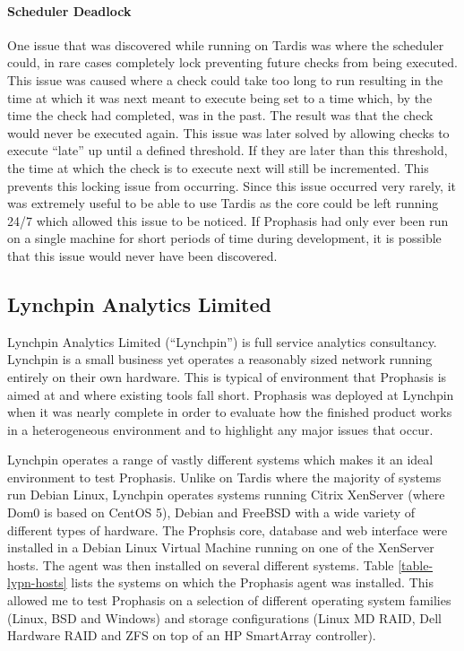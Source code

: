 \documentclass[bsc,logo,twoside,parskip,singlespacing,notimes]{infthesis}
\begin{document}
\paragraph*{Scheduler Deadlock} %
	One issue that was discovered while running on Tardis was where the scheduler
	could, in rare cases completely lock preventing future checks from being
	executed.  This issue was caused where a check could take too long to run
	resulting in the time at which it was next meant to execute being set to a
	time which, by the time the check had completed, was in the past.  The result
	was that the check would never be executed again.  This issue was later solved by
	allowing checks to execute ``late'' up until a defined threshold. If they are
	later than this threshold, the time at which the check is to execute next will
	still be incremented.  This prevents this locking issue from occurring. Since
	this issue occurred very rarely, it was extremely useful to be able to use
	Tardis as the core could be left running 24/7 which allowed this issue to be
	noticed. If Prophasis had only ever been run on a single machine for short
	periods of time during development, it is possible that this issue would never
	have been discovered.

\pagebreak
\subsection{Lynchpin Analytics Limited}

	Lynchpin Analytics Limited (``Lynchpin'') is full service analytics consultancy.
	Lynchpin is a small business yet
	operates a reasonably sized network running entirely on their own hardware.
	This is typical of environment that Prophasis is aimed at and where existing
	tools fall short.  Prophasis was deployed at Lynchpin when it was nearly
	complete in order to evaluate how the finished product works in a heterogeneous
	environment and to highlight any major issues that occur.


	Lynchpin operates a range of vastly different systems which makes it an
	ideal environment to test Prophasis.  Unlike on Tardis where the majority of
	systems run Debian Linux, Lynchpin operates systems running Citrix XenServer (where
	Dom0 is based on CentOS 5), Debian and FreeBSD with a wide variety of different
	types of hardware.  The Prophsis core, database and web interface were
	installed in a Debian Linux Virtual Machine running on one of the XenServer
	hosts.  The agent was then installed on several different systems.  Table
	\ref{table-lypn-hosts} lists the systems on which the Prophasis agent was
	installed.  This allowed me to test Prophasis on a selection of different
	operating system families (Linux, BSD and Windows) and storage configurations
	(Linux MD RAID, Dell Hardware RAID and ZFS on top of an HP SmartArray
	controller).
\end{document}
